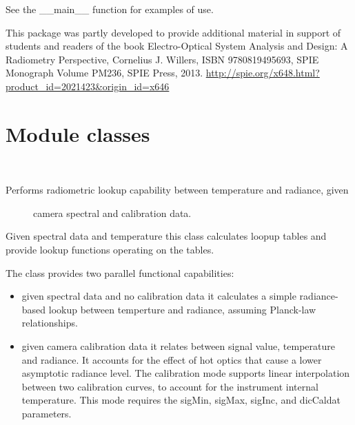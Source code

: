 \documentclass[a4paper,10pt,english]{sphinxmanual}
\begin{document}
See the \_\_main\_\_ function for examples of use.

This package was partly developed to provide additional material in support of students 
and readers of the book Electro-Optical System Analysis and Design: A Radiometry 
Perspective,  Cornelius J. Willers, ISBN 9780819495693, SPIE Monograph Volume
PM236, SPIE Press, 2013.  \href{http://spie.org/x648.html?product\_id=2021423\&origin\_id=x646}{http://spie.org/x648.html?product\_id=2021423\&origin\_id=x646}


\section{Module classes}
\label{rylookup:module-classes}

\begin{fulllineitems}
\label{rylookup:pyradi.rylookup.RadLookup}~\begin{description}
\item[{Performs radiometric lookup capability between temperature and radiance, given }] \leavevmode
camera spectral and calibration data.

\end{description}

Given spectral data and temperature this class calculates loopup tables and 
provide lookup functions operating on the tables.

The class provides two parallel functional capabilities:
\begin{itemize}
\item {} 
given spectral data and no calibration data it calculates a simple radiance-based
lookup between temperture and radiance, assuming Planck-law relationships.

\item {} 
given camera calibration data it relates between signal value, temperature and
radiance.  It accounts for the effect of hot optics that cause a lower asymptotic
radiance level.  The calibration mode supports linear interpolation between two
calibration curves, to account for the instrument internal temperature. This 
mode requires the sigMin, sigMax, sigInc, and dicCaldat parameters.


\end{itemize}
\end{fulllineitems}
\end{document}
